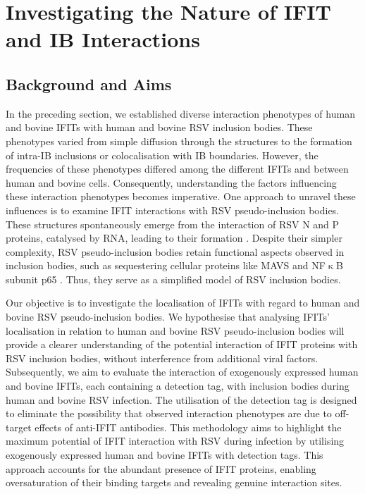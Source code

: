 \chapter{Investigating the Nature of IFIT and IB Interactions} \label{ch:Investigating the Nature of IFIT and IB Interactions}
\section{Background and Aims} \label{sec:Background and Aims-Chapter4}
In the preceding section, we established diverse interaction phenotypes of human and bovine IFITs with human and bovine RSV inclusion bodies. These phenotypes varied from simple diffusion through the structures to the formation of intra-IB inclusions or colocalisation with IB boundaries. However, the frequencies of these phenotypes differed among the different IFITs and between human and bovine cells. Consequently, understanding the factors influencing these interaction phenotypes becomes imperative. One approach to unravel these influences is to examine IFIT interactions with RSV pseudo-inclusion bodies. These structures spontaneously emerge from the interaction of RSV N and P proteins, catalysed by RNA, leading to their formation \cite{Rincheval2017FunctionalVirus, Galloux2020MinimalVitro}. Despite their simpler complexity, RSV pseudo-inclusion bodies retain functional aspects observed in inclusion bodies, such as sequestering cellular proteins like MAVS and NF$\upkappa$B subunit p65 \cite{Rincheval2017FunctionalVirus, Jobe2023ViralCondensates}. Thus, they serve as a simplified model of RSV inclusion bodies.

Our objective is to investigate the localisation of IFITs with regard to human and bovine RSV pseudo-inclusion bodies. We hypothesise that analysing IFITs' localisation in relation to human and bovine RSV pseudo-inclusion bodies will provide a clearer understanding of the potential interaction of IFIT proteins with RSV inclusion bodies, without interference from additional viral factors. Subsequently, we aim to evaluate the interaction of exogenously expressed human and bovine IFITs, each containing a detection tag, with inclusion bodies during human and bovine RSV infection. The utilisation of the detection tag is designed to eliminate the possibility that observed interaction phenotypes are due to off-target effects of anti-IFIT antibodies. This methodology aims to highlight the maximum potential of IFIT interaction with RSV during infection by utilising exogenously expressed human and bovine IFITs with detection tags. This approach accounts for the abundant presence of IFIT proteins, enabling oversaturation of their binding targets and revealing genuine interaction sites.

